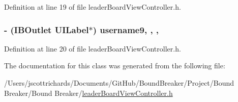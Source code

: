Definition at line 19 of file leader\+Board\+View\+Controller.\+h.

\hypertarget{interfaceleader_board_view_controller_a944c15dbf05091d2385434f3f9155205}{}
\subsubsection[{username9}]{\setlength{\rightskip}{0pt plus 5cm}-\/ (I\+B\+Outlet U\+I\+Label$\ast$) username9\hspace{0.3cm}{\ttfamily [read]}, {\ttfamily [write]}, {\ttfamily [nonatomic]}, {\ttfamily [weak]}}\label{interfaceleader_board_view_controller_a944c15dbf05091d2385434f3f9155205}


Definition at line 20 of file leader\+Board\+View\+Controller.\+h.



The documentation for this class was generated from the following file\+:\begin{DoxyCompactItemize}
\item 
/\+Users/jscottrichards/\+Documents/\+Git\+Hub/\+Bound\+Breaker/\+Project/\+Bound Breaker/\+Bound Breaker/\hyperlink{leader_board_view_controller_8h}{leader\+Board\+View\+Controller.\+h}\end{DoxyCompactItemize}

